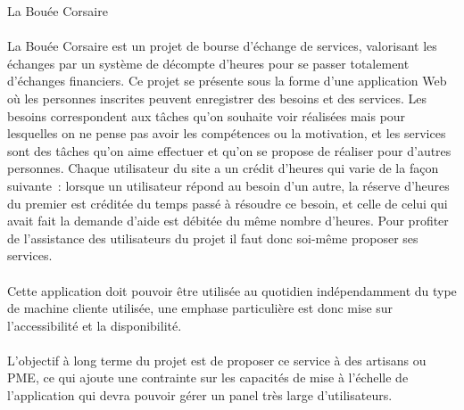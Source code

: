 \documentclass[french]{article}
\begin{document}
	
	
	{\Huge
		La Bouée Corsaire
	}\\ [0.5cm]
	
	\paragraph{}
		La Bouée Corsaire est un projet de bourse d’échange de services,
		 valorisant les échanges par un système de décompte d’heures pour se
		 passer totalement d’échanges financiers. Ce projet se présente sous la
		 forme d’une application Web où les personnes inscrites peuvent
		 enregistrer des besoins et des services. Les besoins correspondent aux
		 tâches qu’on souhaite voir réalisées mais pour lesquelles on ne pense pas
		 avoir les compétences ou la motivation, et les services sont des tâches
		 qu’on aime effectuer et qu’on se propose de réaliser pour d’autres
		 personnes. Chaque utilisateur du site a un crédit d’heures qui varie de
		 la façon suivante : lorsque un utilisateur répond au besoin d’un autre,
		 la réserve d’heures du premier est créditée du temps passé à résoudre ce
		 besoin, et celle de celui qui avait fait la demande d’aide est débitée du
		 même nombre d’heures. Pour profiter de l’assistance des utilisateurs du
		 projet il faut donc soi-même proposer ses services.
	\paragraph{}
		Cette application doit pouvoir être utilisée au quotidien indépendamment
		 du type de machine cliente utilisée, une emphase particulière est donc
		 mise sur l’accessibilité et la disponibilité.
	\paragraph{}
		L’objectif à long terme du projet est de proposer ce service à des
		 artisans ou PME, ce qui ajoute une contrainte sur les capacités de mise à
		 l’échelle de l’application qui devra pouvoir gérer un panel très large
		 d’utilisateurs.
	
\end{document}

